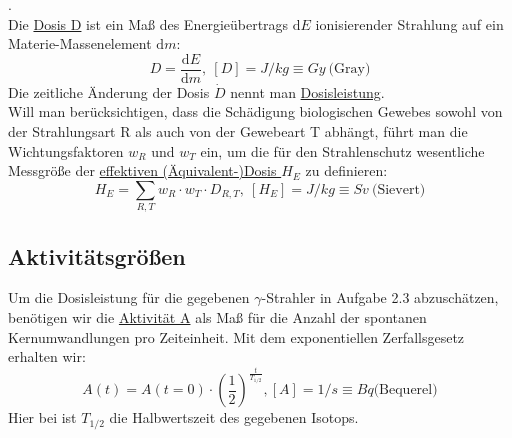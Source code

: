 \begin{definition}[Dosisgrößen].\\
	Die \underline{Dosis D} ist ein Maß des Energieübertrags $\mathrm{d}E$ ionisierender Strahlung 		auf ein Materie-Massenelement $\mathrm{d}m$:
\begin{equation}\label{eq:dosis}
	D = \frac{\mathrm{d}E}{\mathrm{d}m},\ [D] = J/kg \equiv Gy\ \textrm{(Gray)}
\end{equation}
Die zeitliche Änderung der Dosis $\dot{D}$ nennt man \underline{Dosisleistung}.\\
Will man berücksichtigen, dass die Schädigung biologischen Gewebes sowohl von der Strahlungsart R als auch von der Gewebeart T abhängt, führt man die Wichtungsfaktoren $w_R$ und $w_T$ ein, um die für den Strahlenschutz wesentliche Messgröße der \underline{effektiven (Äquivalent-)Dosis $H_E$} zu definieren:
\begin{equation}
	H_E = \sum_{R,T} w_R \cdot w_T \cdot D_{R,T},\ [H_E]=J/kg \equiv Sv\ \textrm{(Sievert)}
\end{equation}
\end{definition}

\subsection{Aktivitätsgrößen}
Um die Dosisleistung für die gegebenen $\gamma$-Strahler in Aufgabe 2.3 abzuschätzen, benötigen wir die \underline{Aktivität A} als Maß für die Anzahl der spontanen Kernumwandlungen pro Zeiteinheit. Mit dem exponentiellen Zerfallsgesetz erhalten wir:
\begin{equation}
	A(t)=A(t=0) \cdot \left(\frac{1}{2}\right)^{\frac{t}{T_{1/2}}}, [A] = 1/s \equiv Bq \textrm{(Bequerel)}
\end{equation}
Hier bei ist $T_{1/2}$ die Halbwertszeit des gegebenen Isotops.

